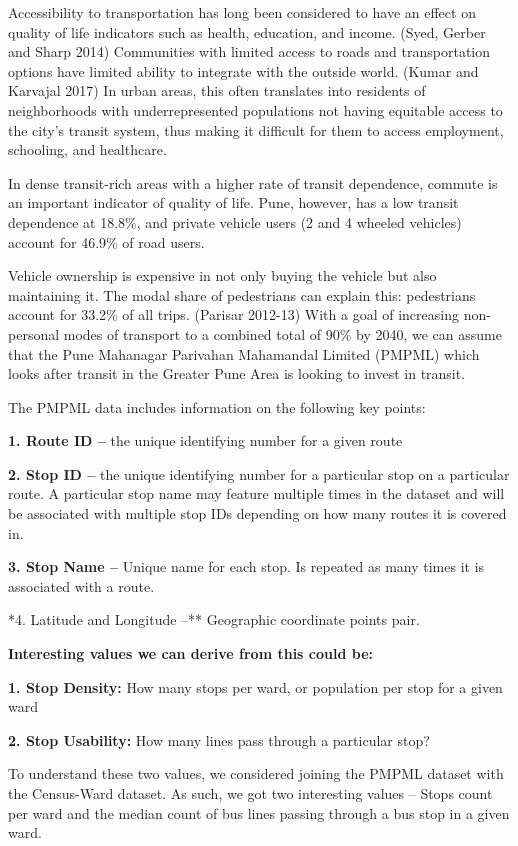 \documentclass[
]{article}
\begin{document}
Accessibility to transportation has long been considered to have an
effect on quality of life indicators such as health, education, and
income. (Syed, Gerber and Sharp 2014) Communities with limited access to
roads and transportation options have limited ability to integrate with
the outside world. (Kumar and Karvajal 2017) In urban areas, this often
translates into residents of neighborhoods with underrepresented
populations not having equitable access to the city's transit system,
thus making it difficult for them to access employment, schooling, and
healthcare.

In dense transit-rich areas with a higher rate of transit dependence,
commute is an important indicator of quality of life. Pune, however, has
a low transit dependence at 18.8\%, and private vehicle users (2 and 4
wheeled vehicles) account for 46.9\% of road users.

Vehicle ownership is expensive in not only buying the vehicle but also
maintaining it. The modal share of pedestrians can explain this:
pedestrians account for 33.2\% of all trips. (Parisar 2012-13) With a
goal of increasing non-personal modes of transport to a combined total
of 90\% by 2040, we can assume that the Pune Mahanagar Parivahan
Mahamandal Limited (PMPML) which looks after transit in the Greater Pune
Area is looking to invest in transit.

The PMPML data includes information on the following key points:

\textbf{1. Route ID --} the unique identifying number for a given route

\textbf{2. Stop ID --} the unique identifying number for a particular
stop on a particular route. A particular stop name may feature multiple
times in the dataset and will be associated with multiple stop IDs
depending on how many routes it is covered in.

\textbf{3. Stop Name --} Unique name for each stop. Is repeated as many
times it is associated with a route.

*4. Latitude and Longitude --** Geographic coordinate points pair.

\textbf{Interesting values we can derive from this could be:}

\textbf{1. Stop Density:} How many stops per ward, or population per
stop for a given ward

\textbf{2. Stop Usability:} How many lines pass through a particular
stop?

To understand these two values, we considered joining the PMPML dataset
with the Census-Ward dataset. As such, we got two interesting values --
Stops count per ward and the median count of bus lines passing through a
bus stop in a given ward.
\end{document}
